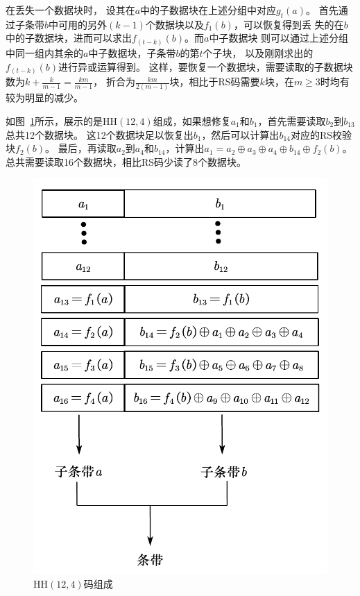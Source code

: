 在丢失一个数据块时，
设其在$a$中的子数据块在上述分组中对应$g_t(a)$。
首先通过子条带$b$中可用的另外$(k-1)$个数据块以及$f_1(b)$，可以恢复得到丢
失的在$b$中的子数据块，进而可以求出$f_{(t-k)}(b)$。而$a$中子数据块
则可以通过上述分组中同一组内其余的$a$中子数据块，子条带$b$的第$t$个子块，
以及刚刚求出的$f_{(t-k)}(b)$进行异或运算得到。 
这样，要恢复一个数据块，需要读取的子数据块数为$k+\frac{k}{m-1}=\frac{km}{m-1}$，
折合为$\frac{km}{2(m-1)}$块，相比于RS码需要$k$块，在$m \geqslant 3$时均有较为明显的减少。

如图~\ref{fig:4.2}所示，展示的是HH$(12,4)$组成，如果想修复$a_1$和$b_1$，首先需要读取$b_2$到$b_{13}$总共12个数据块。
这12个数据块足以恢复出$b_1$，然后可以计算出$b_{14}$对应的RS校验块$f_2(b)$。
最后，再读取$a_2$到$a_4$和$b_{14}$，计算出$a_1=a_2\oplus a_3 \oplus a_4 \oplus b_{14} \oplus f_2(b)$。
总共需要读取16个数据块，相比RS码少读了8个数据块。

\begin{figure}[htbp]
	\centering
	\includegraphics [scale=0.5]{figures/4.2.pdf}
	\caption{HH$(12,4)$码组成}
	\label{fig:4.2}
\end{figure}

